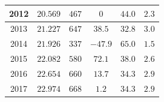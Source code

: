 \documentclass[10pt,a4paper]{report}
\begin{document}
\begin{doublespacing}
\begin{table}[H]
{\begin{tabular}{|c|c|c|c|c|c|}
	2012             & \( 20.569 \)                                                                                  & \( 467 \)                                                                              & \( 0 \)                & \( 44.0 \)                                                                                               & \( 2.3 \)                                                                                            \\ \hline
	2013             & \( 21.227 \)                                                                                  & \( 647 \)                                                                              & \( 38.5 \)             & \( 32.8 \)                                                                                               & \( 3.0 \)                                                                                            \\ \hline
	2014             & \( 21.926 \)                                                                                  & \( 337 \)                                                                              & \( -47.9 \)            & \( 65.0 \)                                                                                               & \( 1.5 \)                                                                                            \\ \hline
	2015             & \( 22.082 \)                                                                                  & \( 580 \)                                                                              & \( 72.1 \)             & \( 38.0 \)                                                                                               & \( 2.6 \)                                                                                            \\ \hline
	2016             & \( 22.654 \)                                                                                  & \( 660 \)                                                                              & \( 13.7 \)             & \( 34.3 \)                                                                                               & \( 2.9 \)                                                                                            \\ \hline
	2017             & \( 22.974 \)                                                                                  & \( 668 \)                                                                              & \( 1.2 \)              & \( 34.3 \)                                                                                               & \( 2.9 \)                                                                                            \\ \hline

\end{tabular}}
\end{table}
\end{doublespacing}
\end{document}
